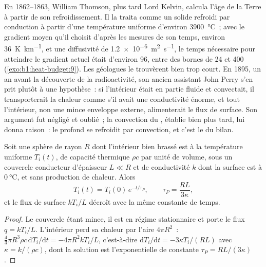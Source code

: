 \begin{history}
En 1862--1863, William Thomson, plus tard Lord Kelvin, calcula l'âge de la Terre à
partir de son refroidissement. Il la traita comme un solide refroidi par conduction
à partir d'une température uniforme d'environ \qty{3900}{\degreeCelsius}~; avec le
gradient moyen qu'il choisit d'après les mesures de son temps, environ
\qty{36}{K.km^{-1}}, et une diffusivité de
\qty{1.2e-6}{m^2.s^{-1}}, le temps nécessaire pour atteindre le gradient actuel
était d'environ \qty{96}{\Ma}, entre des bornes de 24 et \qty{400}{\Ma}
(\cref{exo:b1:heat-budget:9}). Les géologues le
trouvèrent bien trop court. En 1895, un an avant la découverte de la
radioactivité, son ancien assistant John Perry s'en prit plutôt à une hypothèse~:
si l'intérieur était en partie fluide et convectait, il transporterait la chaleur
comme s'il avait une conductivité énorme, et tout l'intérieur, non une mince
enveloppe externe, alimenterait le flux de surface. Son argument fut négligé et
oublié~; la convection du , établie bien plus tard, lui donna raison~: le
 profond se refroidit par convection, et c'est le  du bilan. %
\end{history}

\begin{proposition}\label{prop:b1:heat-budget:perry}
Soit une sphère de rayon $R$ dont l'intérieur bien brassé est à la température
uniforme $T_i(t)$, de capacité thermique $\rho c$ par unité de volume, sous un
couvercle conducteur d'épaisseur $L \ll R$ et de conductivité $k$ dont la
surface est à $\qty{0}{\degreeCelsius}$, et sans production de chaleur. Alors
\[
  T_i(t) = T_i(0)\,e^{-t/\tau_P}, \qquad \tau_P = \frac{RL}{3\kappa},
\]
et le flux de surface $kT_i/L$ décroît avec la même constante de temps.
\end{proposition}

\begin{proof}
Le couvercle étant mince, il est en régime stationnaire et porte le flux
$q = kT_i/L$. L'intérieur perd sa chaleur par l'aire $4\pi R^2$~:
$\tfrac43\pi R^3\rho c\,\mathrm dT_i/\mathrm dt = -4\pi R^2 kT_i/L$, c'est-à-dire
$\mathrm dT_i/\mathrm dt = -3\kappa T_i/(RL)$ avec $\kappa = k/(\rho c)$, dont la
solution est l'exponentielle de constante $\tau_P = RL/(3\kappa)$.
\end{proof}

